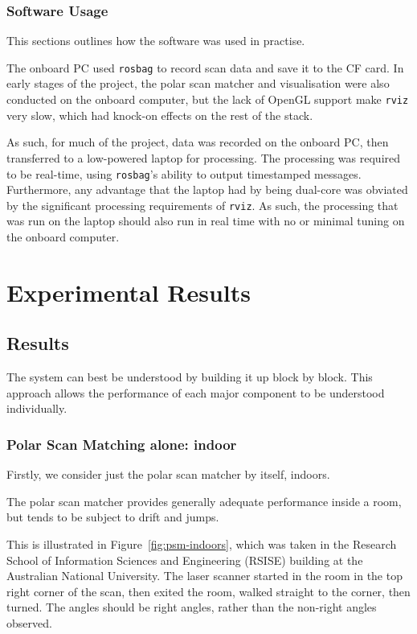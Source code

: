 \documentclass[12pt,oneside,a4paper,draft]{book}
\begin{document}
\section{Software Usage}
\label{sec:software-usage}

This sections outlines how the software was used in practise.

The onboard PC used \texttt{rosbag} to record scan data and save it to
the CF card. In early stages of the project, the polar scan matcher
and visualisation were also conducted on the onboard computer, but the
lack of OpenGL support make \texttt{rviz} very slow, which had
knock-on effects on the rest of the stack.

As such, for much of the project, data was recorded on the onboard PC,
then transferred to a low-powered laptop for processing. The
processing was required to be real-time, using \texttt{rosbag}'s
ability to output timestamped messages. Furthermore, any advantage
that the laptop had by being dual-core was obviated by the significant
processing requirements of \texttt{rviz}. As such, the processing that
was run on the laptop should also run in real time with no or minimal
tuning on the onboard computer.

\part{Experimental Results}
\chapter{Results}
\label{cha:results}

The system can best be understood by building it up block by
block. This approach allows the performance of each major component to
be understood individually.

\section{Polar Scan Matching alone: indoor}
\label{sec:psm-indoor}

Firstly, we consider just the polar scan matcher by itself, indoors.

The polar scan matcher provides generally adequate performance inside
a room, but tends to be subject to drift and jumps. 

This is illustrated in Figure~\ref{fig:psm-indoors}, which was taken
in the Research School of Information Sciences and Engineering (RSISE)
building at the Australian National University. The laser scanner
started in the room in the top right corner of the scan, then exited
the room, walked straight to the corner, then turned. The angles
should be right angles, rather than the non-right angles observed.
\end{document}

